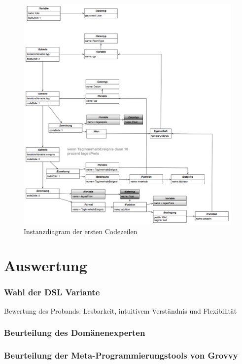 \documentclass[11pt,english,ngerman, headsepline]{scrreprt}
\begin{document}
\begin{figure}[h!]
	\begin{center}
	\includegraphics[width=0.99\textwidth]{pics/mmInstanz}
	\end{center}
	\caption{Instanzdiagram der ersten Codezeilen}
	\label{mmInstanz.png}
\end{figure}
 
\chapter{Auswertung}



\subsection{Wahl der DSL Variante}
Bewertung des Probands: Lesbarkeit, intuitivem Verständnis und Flexibilität

\subsection{Beurteilung des Domänenexperten}

\subsection{Beurteilung der Meta-Programmierungstools von Grovvy}
 
\end{document}
